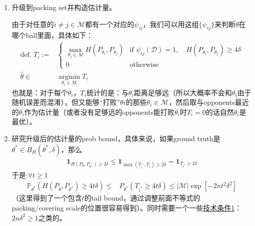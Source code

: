 \documentclass[11pt,a4paper]{ctexart}
\numberwithin{equation}{section}%
\begin{document}
\begin{enumerate}[topsep=2pt,itemsep=2pt]
    \item 升级到packing set并构造估计量。
    
    由于对任意的$ i\neq j\in \mathcal{M} $都有一个对应的$ \psi_{ij} $，我们可以用这组$ \{\psi_{ij}\} $来判断$ \theta $在哪个ball里面，具体如下：
    \begin{align*}
        \text{def. }T_i:=& \begin{cases}
            \max_{\theta_j\in \mathcal{M}} H(P_{\theta _i},P_{\theta _j}) & \text{if }\psi_{ij}(\mathcal{D} )=1,\quad H(P_{\theta _i},P_{\theta _j})\geq 4\delta \\
            0 & \text{otherwise}
        \end{cases} \\
        \hat{\theta }\in&  \mathop{ \arg\min  }\limits_{\theta _i\in \mathcal{M}} T_i 
    \end{align*}
    也就是：对于每个$ \theta _i $，$ T_i $统计的是：与$ \theta _i $距离足够远（所以大概率不会和$ \theta _i $由于随机误差而混淆），但又能够“打败”$ \theta i $的那些$ \theta _i\in\mathcal{M} $，然后取与opponents最近的$ \theta _i $作为估计量（或者没有足够远的opponents能打败$ \theta _i $时$ T_i=0 $的话自然$ \theta _i $是最优）。
    
    \item 研究升级后的估计量的prob bound，具体来说，如果ground truth是$ \theta ^* \in B_H(\theta ^*, \delta )$，那么
    \begin{align*}
        \mathbf{1}_{H(P_{\hat{\theta }},P_{\theta ^*})\geq 2\delta } \leq \mathbf{1}_{\max(T_{i^*},T_{\hat{i}})\geq 2\delta } = \mathbf{1}_{T_{i^*}\geq 2\delta } 
    \end{align*}
    于是:$ \forall t\geq 1  $
    \begin{align*}
        \mathbb{P}_{\theta ^*}\left( H(P_{\hat{\theta }}, P_{\theta^*}) \geq 4t\delta   \right) \leq & P_{\theta^*}  \left( T_{i^*}\geq 4t\delta  \right) \leq \left\vert \mathcal{M} \right\vert \exp\left[ -2nt^2\delta ^2 \right]\tag{$ \star $}
    \end{align*}
    （这里得到了一个包含$ t $的tail bound，通过调整前面不等式的packing/covering scale的位置很容易得到）。同时需要一个一些\uline{技术条件1}：$ 2n\delta ^2\geq 1 $之类的。


\end{enumerate}
\end{document}
